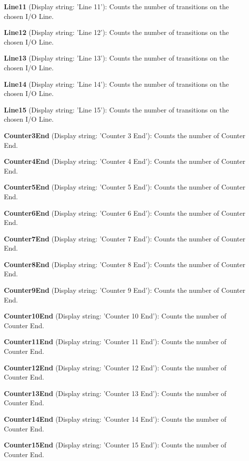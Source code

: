 \begin{DoxyItemize}
\item {\bfseries Line11} (Display string\+: 'Line 11')\+: Counts the number of transitions on the chosen I/\+O Line.
\item {\bfseries Line12} (Display string\+: 'Line 12')\+: Counts the number of transitions on the chosen I/\+O Line.
\item {\bfseries Line13} (Display string\+: 'Line 13')\+: Counts the number of transitions on the chosen I/\+O Line.
\item {\bfseries Line14} (Display string\+: 'Line 14')\+: Counts the number of transitions on the chosen I/\+O Line.
\item {\bfseries Line15} (Display string\+: 'Line 15')\+: Counts the number of transitions on the chosen I/\+O Line.
\item {\bfseries Counter3\+End} (Display string\+: 'Counter 3 End')\+: Counts the number of Counter End.
\item {\bfseries Counter4\+End} (Display string\+: 'Counter 4 End')\+: Counts the number of Counter End.
\item {\bfseries Counter5\+End} (Display string\+: 'Counter 5 End')\+: Counts the number of Counter End.
\item {\bfseries Counter6\+End} (Display string\+: 'Counter 6 End')\+: Counts the number of Counter End.
\item {\bfseries Counter7\+End} (Display string\+: 'Counter 7 End')\+: Counts the number of Counter End.
\item {\bfseries Counter8\+End} (Display string\+: 'Counter 8 End')\+: Counts the number of Counter End.
\item {\bfseries Counter9\+End} (Display string\+: 'Counter 9 End')\+: Counts the number of Counter End.
\item {\bfseries Counter10\+End} (Display string\+: 'Counter 10 End')\+: Counts the number of Counter End.
\item {\bfseries Counter11\+End} (Display string\+: 'Counter 11 End')\+: Counts the number of Counter End.
\item {\bfseries Counter12\+End} (Display string\+: 'Counter 12 End')\+: Counts the number of Counter End.
\item {\bfseries Counter13\+End} (Display string\+: 'Counter 13 End')\+: Counts the number of Counter End.
\item {\bfseries Counter14\+End} (Display string\+: 'Counter 14 End')\+: Counts the number of Counter End.
\item {\bfseries Counter15\+End} (Display string\+: 'Counter 15 End')\+: Counts the number of Counter End.

\end{DoxyItemize}
